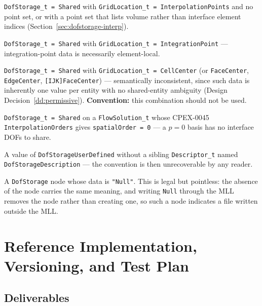 \documentclass[11pt,letterpaper]{article}
\begin{document}
\begin{description}[leftmargin=2em]
\item[Error:] \texttt{DofStorage\_t = Shared} with
  \texttt{GridLocation\_t = InterpolationPoints} and no point set, or
  with a point set that lists volume rather than interface element
  indices (Section~\ref{sec:dofstorage-interp}).

\item[Error:] \texttt{DofStorage\_t = Shared} with
  \texttt{GridLocation\_t = IntegrationPoint} --- integration-point
  data is necessarily element-local.

\item[Warning:] \texttt{DofStorage\_t = Shared} with
  \texttt{GridLocation\_t = CellCenter} (or \texttt{FaceCenter},
  \texttt{EdgeCenter}, \texttt{[IJK]FaceCenter}) --- semantically
  inconsistent, since such data is inherently one value per entity
  with no shared-entity ambiguity (Design
  Decision~\ref{dd:permissive}).  \textbf{Convention:} this
  combination should not be used.

\item[Warning:] \texttt{DofStorage\_t = Shared} on a
  \texttt{FlowSolution\_t} whose CPEX-0045 \texttt{InterpolationOrders}
  gives \texttt{spatialOrder = 0} --- a $p=0$ basis has no interface
  DOFs to share.

\item[Warning:] A value of \texttt{DofStorageUserDefined} without
  a sibling \texttt{Descriptor\_t} named
  \texttt{DofStorageDescription} --- the convention is then
  unrecoverable by any reader.

\item[Warning:] A \texttt{DofStorage} node whose data is
  \texttt{"Null"}.  This is legal but pointless: the absence of the
  node carries the same meaning, and writing \texttt{Null} through the
  MLL removes the node rather than creating one, so such a node
  indicates a file written outside the MLL.

\end{description}

\section{Reference Implementation, Versioning, and Test Plan}
\label{sec:refimpl}

\subsection{Deliverables}
\end{document}
